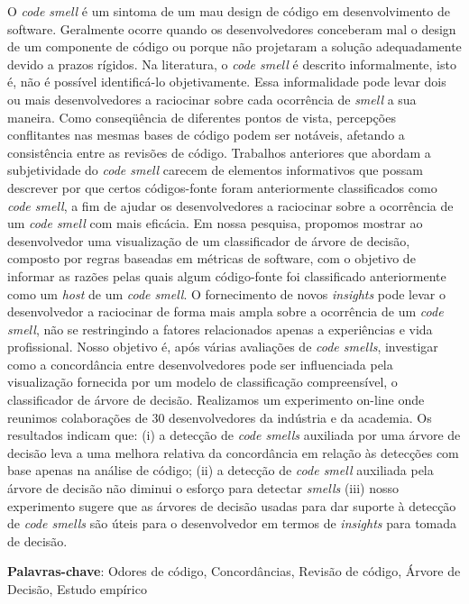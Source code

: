 \vspace{2.2cm}

\begin{center}
\end{center}

\vspace{0.5cm}

\noindent O \textit{code smell} é um sintoma de um mau design de código em desenvolvimento de software. Geralmente ocorre quando os desenvolvedores conceberam mal o design de um componente de código ou porque não projetaram a solução adequadamente devido a prazos rígidos. Na literatura, o \textit{code smell} é descrito informalmente, isto é, não é possível identificá-lo objetivamente. Essa informalidade pode levar dois ou mais desenvolvedores a raciocinar sobre cada ocorrência de \textit{smell} a sua maneira. Como conseqüência de diferentes pontos de vista, percepções conflitantes nas mesmas bases de código podem ser notáveis, afetando a consistência entre as revisões de código. 
Trabalhos anteriores que abordam a subjetividade do \textit{code smell} carecem de elementos informativos que possam descrever por que certos códigos-fonte foram anteriormente classificados como \textit{code smell}, a fim de ajudar os desenvolvedores a raciocinar sobre a ocorrência de um \textit{code smell} com mais eficácia. Em nossa pesquisa, propomos mostrar ao desenvolvedor uma visualização de um classificador de árvore de decisão, composto por regras baseadas em métricas de software, com o objetivo de informar as razões pelas quais algum código-fonte foi classificado anteriormente como um \textit{host} de um \textit{code smell}. O fornecimento de novos \textit{insights} pode levar o desenvolvedor a raciocinar de forma mais ampla sobre a ocorrência de um \textit{code smell}, não se restringindo a fatores relacionados apenas a experiências e vida profissional. Nosso objetivo é, após várias avaliações de \textit{code smells}, investigar como a concordância entre desenvolvedores pode ser influenciada pela visualização fornecida por um modelo de classificação compreensível, o classificador de árvore de decisão. Realizamos um experimento on-line onde reunimos colaborações de 30 desenvolvedores da indústria e da academia. Os resultados indicam que: (i) a detecção de \textit{code smells} auxiliada por uma árvore de decisão leva a uma melhora relativa da concordância em relação às detecções com base apenas na análise de código; (ii) a detecção de \textit{code smell} auxiliada pela árvore de decisão não diminui o esforço para detectar \textit{smells} (iii) nosso experimento sugere que as árvores de decisão usadas para dar suporte à detecção de \textit{code smells} são úteis para o desenvolvedor em termos de \textit{insights} para tomada de decisão.


\textbf{Palavras-chave}: Odores de código, Concordâncias, Revisão de código, Árvore de Decisão, Estudo empírico